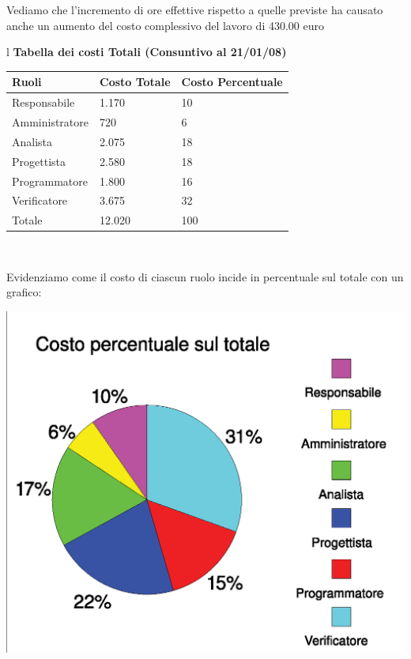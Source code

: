 \documentclass[11pt,titlepage,a4paper]{report}
\begin{document}
Vediamo che l'incremento di ore effettive %
rispetto a quelle previste ha causato
anche un aumento del costo complessivo del lavoro di 430.00 euro

\begin{table}[hbtp]
\large{
\begin{tabular}{l}
\Large{\textbf{\textsf{Tabella dei costi Totali (Consuntivo al 21/01/08)}}} \\
\begin{tabular}{||p{4cm}||p{3cm}||p{3cm}||} \hline
\textbf{Ruoli} & \textbf{Costo Totale}& \textbf{Costo Percentuale}\\ \hline
{Responsabile}&1.170&10\\ \hline 
{Amministratore} &720&6\\ \hline
{Analista} &2.075&18 \\ \hline
{Progettista} &2.580&18 \\ \hline
{Programmatore} &1.800&16\\ \hline
{Verificatore} &3.675&32 \\ \hline
{Totale} &12.020&100 \\ \hline
\end{tabular} \\
\end{tabular}
}
\end{table}


Evidenziamo come il costo di ciascun ruolo incide in percentuale
sul totale con un grafico:
\begin{center}
\includegraphics [width=1\textwidth] {costiPercentuali.eps}
\end{center}
\end{document}
